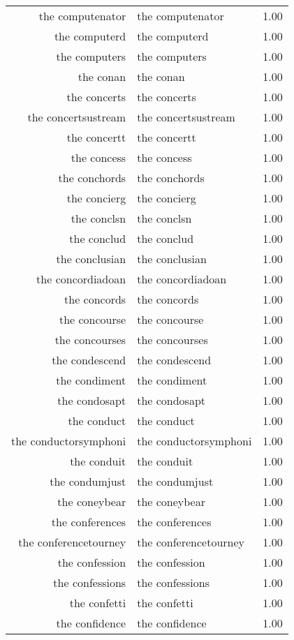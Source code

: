 \begin{table}[ht]
\begin{tabular}{rlr}
  the computenator & the computenator & 1.00 \\ 
  the computerd & the computerd & 1.00 \\ 
  the computers & the computers & 1.00 \\ 
  the conan & the conan & 1.00 \\ 
  the concerts & the concerts & 1.00 \\ 
  the concertsustream & the concertsustream & 1.00 \\ 
  the concertt & the concertt & 1.00 \\ 
  the concess & the concess & 1.00 \\ 
  the conchords & the conchords & 1.00 \\ 
  the concierg & the concierg & 1.00 \\ 
  the conclsn & the conclsn & 1.00 \\ 
  the conclud & the conclud & 1.00 \\ 
  the conclusian & the conclusian & 1.00 \\ 
  the concordiadoan & the concordiadoan & 1.00 \\ 
  the concords & the concords & 1.00 \\ 
  the concourse & the concourse & 1.00 \\ 
  the concourses & the concourses & 1.00 \\ 
  the condescend & the condescend & 1.00 \\ 
  the condiment & the condiment & 1.00 \\ 
  the condosapt & the condosapt & 1.00 \\ 
  the conduct & the conduct & 1.00 \\ 
  the conductorsymphoni & the conductorsymphoni & 1.00 \\ 
  the conduit & the conduit & 1.00 \\ 
  the condumjust & the condumjust & 1.00 \\ 
  the coneybear & the coneybear & 1.00 \\ 
  the conferences & the conferences & 1.00 \\ 
  the conferencetourney & the conferencetourney & 1.00 \\ 
  the confession & the confession & 1.00 \\ 
  the confessions & the confessions & 1.00 \\ 
  the confetti & the confetti & 1.00 \\ 
  the confidence & the confidence & 1.00 \\ 

\end{tabular}
\end{table}
